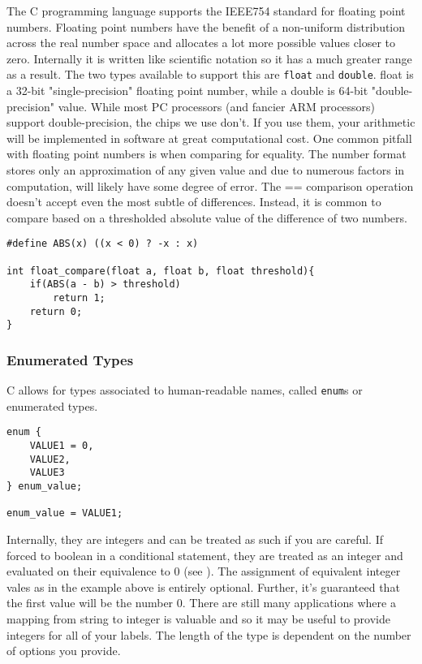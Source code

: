 \documentclass[10pt]{article}
\begin{document}
The C programming language supports the IEEE754 standard for floating point numbers. Floating point numbers have the benefit of a non-uniform distribution across the real number space and allocates a lot more possible values closer to zero. Internally it is written like scientific notation so it has a much greater range as a result.
The two types available to support this are \texttt{float} and \texttt{double}. float is a 32-bit "single-precision" floating point number, while a double is 64-bit "double-precision" value. While most PC processors (and fancier ARM processors) support double-precision, the chips we use don't. If you use them, your arithmetic will be implemented in software at great computational cost.
One common pitfall with floating point numbers is when comparing for equality. The number format stores only an approximation of any given value and due to numerous factors in computation, will likely have some degree of error. The == comparison operation doesn't accept even the most subtle of differences. Instead, it is common to compare based on a thresholded absolute value of the difference of two numbers.
\begin{lstlisting}[label=lst-float-comparison,caption=Float comparison]
#define ABS(x) ((x < 0) ? -x : x)

int float_compare(float a, float b, float threshold){
	if(ABS(a - b) > threshold)
		return 1;
	return 0;
}
\end{lstlisting}

\subsubsection{Enumerated Types}
C allows for types associated to human-readable names, called \texttt{enum}s or enumerated types. \\

\begin{lstlisting}[label=lst-enum,caption=Enumerated types]
enum {
	VALUE1 = 0,
	VALUE2,
	VALUE3
} enum_value;

enum_value = VALUE1;
\end{lstlisting}

Internally, they are integers and can be treated as such if you are careful. If forced to boolean in a conditional statement, they are treated as an integer and evaluated on their equivalence to 0 (see ). The assignment of equivalent integer vales as in the example above is entirely optional. Further, it's guaranteed that the first value will be the number 0. There are still many applications where a mapping from string to integer is valuable and so it may be useful to provide integers for all of your labels. The length of the type is dependent on the number of options you provide. \\
\end{document}
